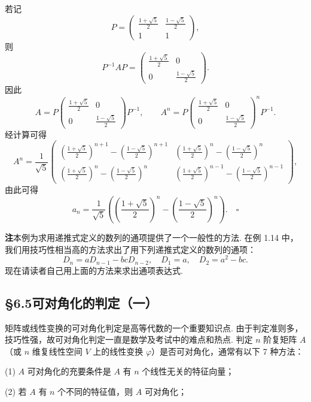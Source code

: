 \documentclass[UTF8,12pt,a4paper,fontset=fandol]{ctexart}
\begin{document}
若记
\[
P=\left(\begin{array}{cc}
\frac{1+\sqrt{5}}{2} & \frac{1-\sqrt{5}}{2}\\
1 & 1
\end{array}\right),
\]
则
\[
P^{-1}AP=\left(\begin{array}{cc}
\frac{1+\sqrt{5}}{2} & 0\\
0 & \frac{1-\sqrt{5}}{2}
\end{array}\right).
\]
因此
\[
A=P\left(\begin{array}{cc}
\frac{1+\sqrt{5}}{2} & 0\\
0 & \frac{1-\sqrt{5}}{2}
\end{array}\right)P^{-1},\qquad
A^n=P\left(\begin{array}{cc}
\frac{1+\sqrt{5}}{2} & 0\\
0 & \frac{1-\sqrt{5}}{2}
\end{array}\right)^nP^{-1}.
\]
经计算可得
\[
A^n=\frac{1}{\sqrt{5}}\left(\begin{array}{cc}
\left(\frac{1+\sqrt{5}}{2}\right)^{n+1}-\left(\frac{1-\sqrt{5}}{2}\right)^{n+1}
&
\left(\frac{1+\sqrt{5}}{2}\right)^n-\left(\frac{1-\sqrt{5}}{2}\right)^n\\
\left(\frac{1+\sqrt{5}}{2}\right)^n-\left(\frac{1-\sqrt{5}}{2}\right)^n
&
\left(\frac{1+\sqrt{5}}{2}\right)^{n-1}-\left(\frac{1-\sqrt{5}}{2}\right)^{n-1}
\end{array}\right),
\]
由此可得
\[
a_n=\frac{1}{\sqrt{5}}\left(\left(\frac{1+\sqrt{5}}{2}\right)^n-\left(\frac{1-\sqrt{5}}{2}\right)^n\right). \quad \square
\]

\noindent\textbf{注}\quad 本例为求用递推式定义的数列的通项提供了一个一般性的方法. 在例 1.14 中，我们用技巧性相当高的方法求出了用下列递推式定义的数列的通项：
\[
D_n=aD_{n-1}-bcD_{n-2},\quad D_1=a,\quad D_2=a^2-bc.
\]
现在请读者自己用上面的方法来求出通项表达式.

\subsection*{§6.5\quad 可对角化的判定（一）}

矩阵或线性变换的可对角化判定是高等代数的一个重要知识点. 由于判定准则多，技巧性强，故可对角化判定一直是数学及考试中的难点和热点. 判定 $n$ 阶复矩阵 $A$（或 $n$ 维复线性空间 $V$ 上的线性变换 $\varphi$）是否可对角化，通常有以下 7 种方法：

(1) $A$ 可对角化的充要条件是 $A$ 有 $n$ 个线性无关的特征向量；

(2) 若 $A$ 有 $n$ 个不同的特征值，则 $A$ 可对角化；
\end{document}
